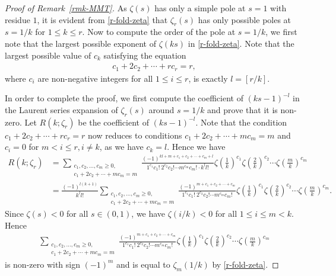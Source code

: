 \documentclass[12pt]{amsart}
\newcommand{\rmkref}[1]{Remark~\ref{#1}}
\begin{document}
\begin{proof}[Proof of \rmkref{rmk-MMT}]
As $\zeta(s)$ has only a simple pole at $s=1$ with residue $1$, it is evident from \eqref{r-fold-zeta} that $\zeta_r(s)$ has only possible poles at $s=1/k$ for $1\leq k\leq r$. Now to compute the order of the pole at $s=1/k$, we first note that the largest possible exponent of $\zeta(ks)$ in \eqref{r-fold-zeta}. Note that the largest possible value of  $c_k$ satisfying the equation 
\begin{align}\label{eq-part}
c_1+2c_2+\cdots+rc_r=r,
\end{align}
where $c_i$ are non-negative integers for all $1\leq i\leq r$, is exactly $l=[r/k]$.

In order to complete the proof, we first compute the coefficient of $(ks-1)^{-l}$ in the Laurent series expansion of $\zeta_r(s)$ around $s=1/k$ and prove that it is non-zero. Let $R(k;\zeta_{r})$ be the coefficient of $(ks-1)^{-l}$. Note that the condition 
$c_1+2c_2+\cdots+rc_r=r$ now reduces to conditions $c_1+2c_2+\cdots+mc_m=m$ and $c_i=0$ for $m<i \le r, i \ne k$, as we have $c_k=l$. Hence we have 
\begin{align*}
R(k;\zeta_{r})&=
\sum_{\substack{c_1,c_2, \ldots,c_m \geq 0, \\c_1+2c_2+\cdots+mc_m=m}}\frac{(-1)^{kl+m+c_1+c_2+\cdots+c_m+l}}{1^{c_1}c_1! \  2^{c_2}c_2!\cdots m^{c_m}c_m!\cdot k^ll!}\zeta\left(\frac{1}{k}\right)^{c_1}\zeta\left(\frac{2}{k}\right)^{c_2}\cdots\zeta\left(\frac{m}{k}\right)^{c_m}\\
&=\frac{(-1)^{l(k+1)}}{k^ll!}\sum_{\substack{c_1,c_2, \ldots,c_m \geq 0, \\c_1+2c_2+\cdots+mc_m=m}}\frac{(-1)^{m+c_1+c_2+\cdots+c_m}}{1^{c_1}c_1! \  2^{c_2}c_2!\cdots m^{c_m}c_m!}\zeta\left(\frac{1}{k}\right)^{c_1}\zeta\left(\frac{2}{k}\right)^{c_2}\cdots\zeta\left(\frac{m}{k}\right)^{c_m}.
\end{align*}
Since $\zeta(s)<0$ for all $s\in (0,1)$, we have $\zeta(i/k)<0$ for all $1\leq i\leq m<k$. Hence
\begin{align*}
\sum_{\substack{c_1,c_2, \ldots,c_m \geq 0, \\c_1+2c_2+\cdots+mc_m=m}}\frac{(-1)^{m+c_1+c_2+\cdots+c_m}}{1^{c_1}c_1! \  2^{c_2}c_2!\cdots m^{c_m}c_m!}\zeta\left(\frac{1}{k}\right)^{c_1}\zeta\left(\frac{2}{k}\right)^{c_2}\cdots\zeta\left(\frac{m}{k}\right)^{c_m}
\end{align*}
is non-zero with sign $(-1)^m$ and is equal to $\zeta_m(1/k)$ by \eqref{r-fold-zeta}.

\end{proof}
\end{document}
